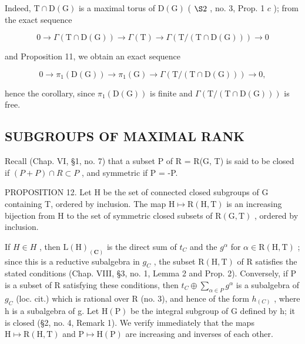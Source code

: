 Indeed, \(\mathrm{T} \cap \mathrm{D}(\mathrm{G})\) is a maximal torus of \(\mathrm{D}(\mathrm{G})\) ( \(\S 2\) , no. 3, Prop. 1 \(c\) ); from the exact sequence

\[
0 \longrightarrow \Gamma (\mathrm{T} \cap \mathrm{D} (\mathrm{G})) \longrightarrow \Gamma (\mathrm{T}) \longrightarrow \Gamma (\mathrm{T} / (\mathrm{T} \cap \mathrm{D} (\mathrm{G}))) \longrightarrow 0
\]

and Proposition 11, we obtain an exact sequence

\[
0 \longrightarrow \pi_ {1} (\mathrm{D} (\mathrm{G})) \longrightarrow \pi_ {1} (\mathrm{G}) \longrightarrow \Gamma (\mathrm{T} / (\mathrm{T} \cap \mathrm{D} (\mathrm{G}))) \longrightarrow 0,
\]

hence the corollary, since \(\pi_{1}(\mathrm{D}(\mathrm{G}))\) is finite and \(\Gamma(\mathrm{T}/(\mathrm{T}\cap\mathrm{D}(\mathrm{G})))\) is free.

\subsection{SUBGROUPS OF MAXIMAL RANK}

Recall (Chap. VI, §1, no. 7) that a subset P of R = R(G, T) is said to be closed if \((P + P) \cap R \subset P\) , and symmetric if P = -P.

PROPOSITION 12. Let H be the set of connected closed subgroups of G containing T, ordered by inclusion. The map \(\mathrm{H} \mapsto \mathrm{R}(\mathrm{H}, \mathrm{T})\) is an increasing bijection from H to the set of symmetric closed subsets of \(\mathrm{R}(\mathrm{G}, \mathrm{T})\) , ordered by inclusion.

If \(H \in H\) , then \(\mathrm{L}(\mathrm{H})_{(\mathbf{C})}\) is the direct sum of \(t_{C}\) and the \(g^{\alpha}\) for \(\alpha \in \mathrm{R}(\mathrm{H}, \mathrm{T})\) ; since this is a reductive subalgebra in \(g_{C}\) , the subset \(\mathrm{R}(\mathrm{H}, \mathrm{T})\) of R satisfies the stated conditions (Chap. VIII, §3, no. 1, Lemma 2 and Prop. 2). Conversely, if P is a subset of R satisfying these conditions, then \(t_{C} \oplus \sum_{\alpha \in P} g^{\alpha}\) is a subalgebra of \(g_{C}\) (loc. cit.) which is rational over R (no. 3), and hence of the form \(h_{(C)}\) , where h is a subalgebra of g. Let \(\mathrm{H}(\mathrm{P})\) be the integral subgroup of G defined by h; it is closed (§2, no. 4, Remark 1). We verify immediately that the maps \(\mathrm{H} \mapsto \mathrm{R}(\mathrm{H}, \mathrm{T})\) and \(\mathrm{P} \mapsto \mathrm{H}(\mathrm{P})\) are increasing and inverses of each other.

